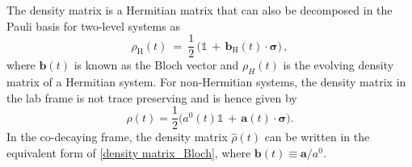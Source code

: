 \documentclass[12pt,a4paper]{article}
\begin{document}
The density matrix is a Hermitian matrix that can also be decomposed in the Pauli basis for two-level systems as
\begin{equation}
    \rho_{\text{H}}(t)\: =\: \dfrac{1}{2}\,\Big(\mathbb{1}\, +\, \mathbf{b}_{\mathrm{H}}(t)\cdot\boldsymbol{\sigma}\Big)\,,\label{density matrix_Bloch}
\end{equation}
where $\mathbf{b}(t)$ is known as the Bloch vector and $\rho_H(t)$ is the  evolving density matrix of a Hermitian system. For non-Hermitian systems, the density matrix in the lab frame is not trace preserving and is hence given by
\begin{equation}
    \rho (t) = \dfrac{1}{2}\Big(a^0(t)\mathbb{1}\, +\, \mathbf{a}(t)\cdot\boldsymbol{\sigma}\Big). 
\end{equation}
In the co-decaying frame, the density matrix $\hat{\rho}(t)$ can be written in the equivalent form of \eqref{density matrix_Bloch}, where $\mathbf{b}(t) \equiv \mathbf{a}/a^0$.
\end{document}

